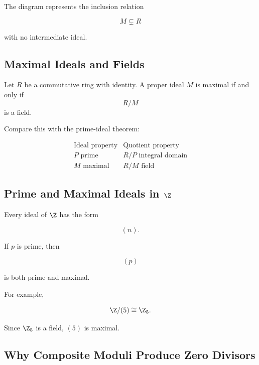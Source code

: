 The diagram represents the inclusion relation

\[ M\subsetneq R \]

with no intermediate ideal.

\subsection{Maximal Ideals and Fields}
\label{subsec:maximal-ideal-field}

\begin{theorem}
Let \(R\) be a commutative ring with identity. A proper ideal \(M\) is maximal
if and only if
\[ R/M \]
is a field.
\end{theorem}

Compare this with the prime-ideal theorem:

\[
\begin{array}{c|c}
\text{Ideal property} & \text{Quotient property}\\
\hline
P\text{ prime} & R/P\text{ integral domain}\\
M\text{ maximal} & R/M\text{ field}
\end{array}
\]

\subsection{Prime and Maximal Ideals in \(\Z\)}
\label{subsec:prime-maximal-z}

Every ideal of \(\Z\) has the form

\[ (n). \]

If \(p\) is prime, then

\[ (p) \]

is both prime and maximal.

For example,

\[ \Z/(5)\cong\Z_5. \]

Since \(\Z_5\) is a field, \((5)\) is maximal.

\subsection{Why Composite Moduli Produce Zero Divisors}
\label{subsec:composite-moduli-zero-divisors}


